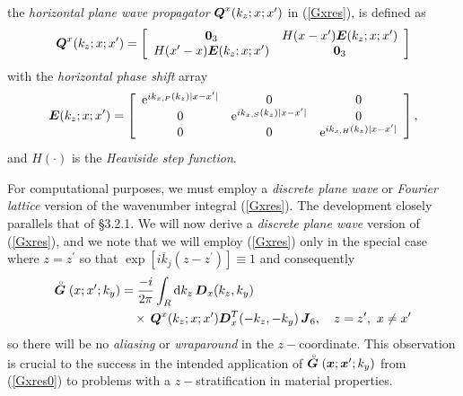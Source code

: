 \documentclass[11pt,a4paper]{article}
\newcommand{\bmi}[1]{\mbox{\boldmath$\mit #1$\unboldmath}}
\newcommand{\rf}[1]{\stackrel{\scriptscriptstyle _{\,\,\circ}}{ #1}}
\begin{document}
the {\em horizontal plane wave propagator\/} ${\bmi Q}^{x}(k_z;x;x^{\prime})$ in (\ref{Gxres}),
is defined  as
\begin{equation} \label{Qxdef}
{\bmi Q}^{x}(k_z;x;x^{\prime})=
\left[{\begin{array}{cc}{\bf 0}_{3}&H(x-{x}^{\prime}){\bmi E}(k_z;x;{x}^{\prime})\\
H(x^{\prime}-{x}){\bmi E}(k_z;x;{x}^{\prime})&{\bf 0}_{3}\end{array}}\right]
\end{equation}
with the {\em horizontal phase shift\/} array
\[
{\bmi E}(k_z;x;{x}^{\prime})=\left[{\begin{array}{ccc}
{\rm e}^{i{ k}_{x,P}(k_{z})|x-{x}^{\prime}|}&{ 0}&{ 0}\\
{ 0}&{\rm e}^{
i{ k}_{x,S}(k_{z})|x-{x}^{\prime}|}&{ 0}\\ { 0}&{ 0}&{\rm e}^{
i{ k}_{x,H}(k_{z})|x-{x}^{\prime}|}\end{array}}\right] ,
\]
and $H(\cdot)$ is the {\em Heaviside step function\/}.


For computational purposes, we must employ a {\em discrete plane wave\/}
or {\em Fourier lattice\/} version of the wavenumber integral
(\ref{Gxres}). The development closely parallels that of \S 3.2.1.
We will now derive a {\em discrete plane wave\/} version of
(\ref{Gxres}), and we note that we
will employ (\ref{Gxres}) only in the special case where $z=z^{\prime}$
so that $\exp \left[i \overline{k}_{j} ({ z}-{
z}^{\prime})\right]\equiv 1$ and consequently
\begin{align} \label{Gxres0}
\rf{\bmi G}({ x};{ x}^{\prime};k_y)&=\frac{- i}{2 \pi}
\int_{R} {\rm d}{ k}_{z}\,  {\bmi  D}_{x}({k}_{z},{k}_{y})\nonumber\\
&\quad\times\,{\bmi Q}^{x}(k_z;x;x^{\prime}){\bmi  D}_{x}^{T}(-{k}_{z},-{k}_{y})
\,{\bmi  J}_6, \quad z=z^{\prime}, \ x\not=x^{\prime}
\end{align}
so there will be no {\em
aliasing\/} or {\em wraparound\/} in the $z-$coordinate. This observation
is crucial to the success in the intended application of $\rf{\bmi G}({\bmi
x};{\bmi x}^{\prime};k_y)$ from (\ref{Gxres0}) to problems with a
$z-$stratification in material properties.
\end{document}
